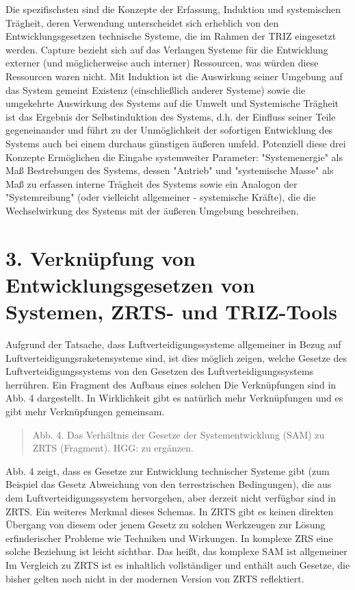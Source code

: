 \documentclass[11pt,a4paper]{article}
\begin{document}
Die spezifischsten sind die Konzepte der Erfassung, Induktion und systemischen
Trägheit, deren Verwendung unterscheidet sich erheblich von den
Entwicklungsgesetzen technische Systeme, die im Rahmen der TRIZ eingesetzt
werden. Capture bezieht sich auf das Verlangen Systeme für die Entwicklung
externer (und möglicherweise auch interner) Ressourcen, was würden diese
Ressourcen waren nicht. Mit Induktion ist die Auswirkung seiner Umgebung auf
das System gemeint Existenz (einschließlich anderer Systeme) sowie die
umgekehrte Auswirkung des Systems auf die Umwelt und Systemische Trägheit ist
das Ergebnis der Selbstinduktion des Systems, d.h. der Einfluss seiner Teile
gegeneinander und führt zu der Unmöglichkeit der sofortigen Entwicklung des
Systems auch bei einem durchaus günstigen äußeren umfeld. Potenziell diese
drei Konzepte Ermöglichen die Eingabe systemweiter Parameter: "Systemenergie"
als Maß Bestrebungen des Systems, dessen "Antrieb" und "systemische Masse" als
Maß zu erfassen interne Trägheit des Systems sowie ein Analogon der
"Systemreibung" (oder vielleicht allgemeiner - systemische Kräfte), die die
Wechselwirkung des Systems mit der äußeren Umgebung beschreiben.

\section*{3. Verknüpfung von Entwicklungsgesetzen von Systemen, ZRTS- und
  TRIZ-Tools}

Aufgrund der Tatsache, dass Luftverteidigungssysteme allgemeiner in Bezug auf
Luftverteidigungsraketensysteme sind, ist dies möglich zeigen, welche Gesetze
des Luftverteidigungssystems von den Gesetzen des Luftverteidigungssystems
herrühren. Ein Fragment des Aufbaus eines solchen Die Verknüpfungen sind in
Abb. 4 dargestellt. In Wirklichkeit gibt es natürlich mehr Verknüpfungen und
es gibt mehr Verknüpfungen gemeinsam.
\begin{quote}
  Abb. 4. Das Verhältnis der Gesetze der Systementwicklung (SAM) zu ZRTS
  (Fragment). HGG: zu ergänzen.
\end{quote}
Abb. 4 zeigt, dass es Gesetze zur Entwicklung technischer Systeme gibt (zum
Beispiel das Gesetz Abweichung von den terrestrischen Bedingungen), die aus
dem Luftverteidigungssystem hervorgehen, aber derzeit nicht verfügbar sind in
ZRTS. Ein weiteres Merkmal dieses Schemas. In ZRTS gibt es keinen direkten
Übergang von diesem oder jenem Gesetz zu solchen Werkzeugen zur Lösung
erfinderischer Probleme wie Techniken und Wirkungen. In komplexe ZRS eine
solche Beziehung ist leicht sichtbar. Das heißt, das komplexe SAM ist
allgemeiner Im Vergleich zu ZRTS ist es inhaltlich vollständiger und enthält
auch Gesetze, die bisher gelten noch nicht in der modernen Version von ZRTS
reflektiert.
\end{document}

